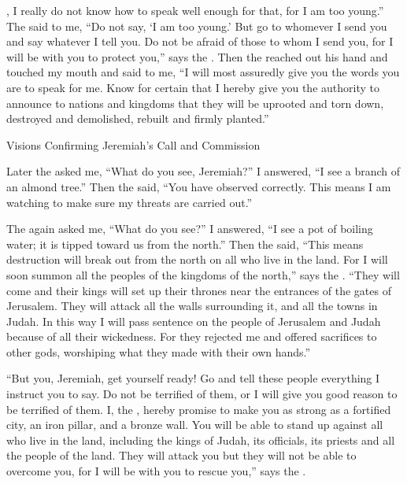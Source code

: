 {{}, I really
do not
know
how to speak
well enough for
that, for I am
too young.”
The
{}
said
to
me, “Do not
say,
‘I am
too young.’
But
go
to whomever
I send
you and say whatever
I
tell you.
Do not
be afraid
of those to whom I send you, for
I
will be with
you to protect
you,” says
the
{}.
Then the
{}
reached
out his hand
and touched
my mouth
and said
to me,
“I
will most assuredly
give
you the words
you are to speak for me.
Know for
certain that I hereby
give you the authority to announce to nations
and kingdoms
that they will be uprooted
and torn
down, destroyed
and demolished,
rebuilt
and firmly planted.”
\par }{\SH Visions Confirming Jeremiah’s Call and Commission
\par }{\PP {}Later
the {}
asked
me, “What
do you
see,
Jeremiah?” I answered,
“I
see
a branch
of an almond tree.”
Then the
{}
said,
“You have observed
correctly.
This means
I am
watching
to make
sure my threats
are carried out.”
\par }{\PP {}The
{}
again
asked
me, “What
do you
see?” I answered,
“I
see
a pot
of boiling
water; it is tipped toward
us from the north.”
Then the
{}
said,
“This means
destruction
will break out from the north
on
all
who live
in the land.
For
I will soon
summon
all
the peoples
of the kingdoms
of the north,”
says
the {}. “They will come
and their kings will set
up their thrones
near the entrances
of the gates
of Jerusalem.
They will attack
all
the walls
surrounding
it, and all
the towns
in Judah.
In this way
I will pass sentence
on
the people of Jerusalem and Judah because
of all
their wickedness.
For they rejected
me and offered
sacrifices to other
gods,
worshiping
what they made
with their own hands.”
\par }{\PP {}“But you,
Jeremiah, get
yourself ready! Go
and tell
these people everything
I
instruct
you to
say. Do not
be terrified
of them, or
I will give you good reason to be terrified of them.
I,
the
{}, hereby
promise to make
you as strong as a fortified
city,
an iron
pillar,
and a bronze
wall.
You will be able to stand up against
all
who live in the land,
including the kings
of Judah,
its officials,
its priests
and all the people
of the land.
They will attack
you but they will not
be able
to overcome you, for
I
will be with
you to rescue
you,” says
the {}.

}
